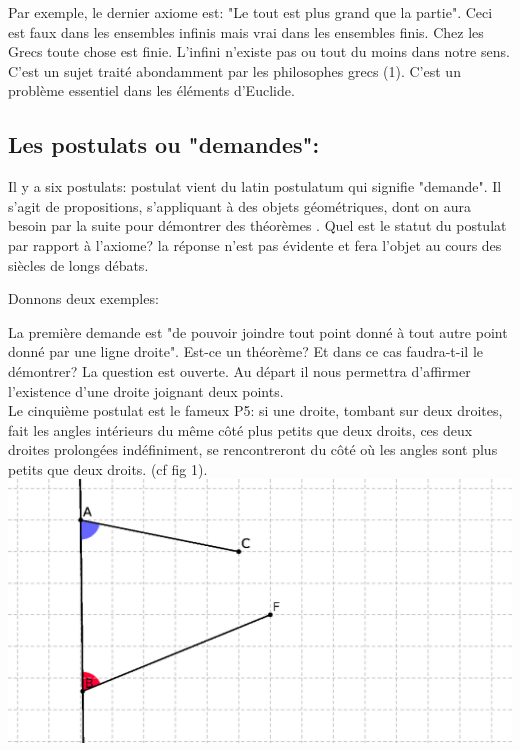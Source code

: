\documentclass[a4paper, 12pt, twoside]{book}
\begin{document}
   
\newpage 
  
  
 Par exemple, le dernier axiome est: "Le tout est plus grand que la partie". Ceci est faux dans les ensembles infinis mais vrai dans les ensembles finis. Chez les Grecs toute chose est finie. L'infini n'existe pas ou tout du moins dans notre sens. C'est un sujet traité abondamment par les philosophes grecs (1). C'est un problème essentiel dans les éléments d'Euclide.\\
 
 \subsection{Les postulats ou "demandes":}
      
    Il y a six postulats: postulat vient du latin postulatum qui signifie "demande". Il s'agit de propositions, s'appliquant à des objets géométriques, dont on aura besoin par la suite pour démontrer des théorèmes . Quel est le statut du postulat par rapport à l'axiome? la réponse n'est pas évidente et fera l'objet au cours des siècles de longs débats.

   Donnons deux exemples:\
   
    La première demande est "de pouvoir joindre tout point donné à tout autre point donné par une ligne droite". Est-ce un théorème? Et dans ce cas faudra-t-il le démontrer? La question est ouverte. Au départ il nous permettra d'affirmer l'existence d'une droite joignant deux points.\\
   
 
    Le cinquième postulat est le fameux P5: si une droite, tombant sur deux droites, fait les angles intérieurs du même côté plus petits que deux droits, ces deux droites prolongées indéfiniment, se rencontreront du côté où les angles sont plus petits que deux droits. (cf fig 1).\\ 
    
     \includegraphics[scale=0.7]{figures/euc1.eps} \\
    
\end{document}
